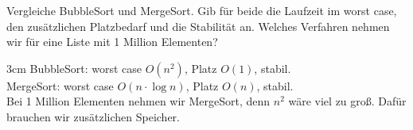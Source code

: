 \question[4]
Vergleiche BubbleSort und MergeSort. Gib für beide die Laufzeit im worst case, den zusätzlichen Platzbedarf und die Stabilität an. Welches Verfahren nehmen wir für eine Liste mit 1 Million Elementen?
\begin{solutionbox}{3cm}
BubbleSort: worst case $O(n^2)$, Platz $O(1)$, stabil. \\
MergeSort: worst case $O(n \cdot \log n)$, Platz $O(n)$, stabil. \\
Bei 1 Million Elementen nehmen wir MergeSort, denn $n^2$ wäre viel zu groß. Dafür brauchen wir zusätzlichen Speicher.
\end{solutionbox}
